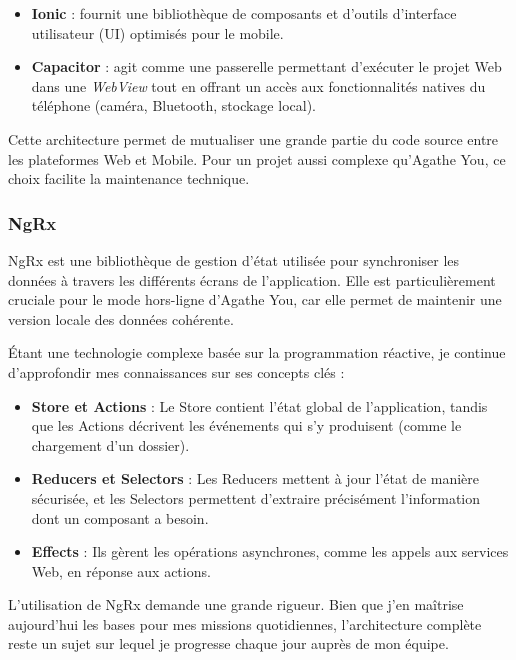 \documentclass{article}
\begin{document}
\begin{itemize}
    \item \textbf{Ionic} : fournit une bibliothèque de composants et d'outils d'interface utilisateur (UI) optimisés pour le mobile.
    \item \textbf{Capacitor} : agit comme une passerelle permettant d'exécuter le projet Web dans une \textit{WebView} tout en offrant un accès aux fonctionnalités natives du téléphone (caméra, Bluetooth, stockage local).
\end{itemize}

Cette architecture permet de mutualiser une grande partie du code source entre les plateformes Web et Mobile. Pour un projet aussi complexe qu'Agathe You, ce choix facilite la maintenance technique.

\subsubsection{NgRx}

NgRx est une bibliothèque de gestion d'état utilisée pour synchroniser les données à travers les différents écrans de l'application. Elle est particulièrement cruciale pour le mode hors-ligne d'Agathe You, car elle permet de maintenir une version locale des données cohérente.

Étant une technologie complexe basée sur la programmation réactive, je continue d'approfondir mes connaissances sur ses concepts clés :

\begin{itemize}
    \item \textbf{Store et Actions} : Le Store contient l'état global de l'application, tandis que les Actions décrivent les événements qui s'y produisent (comme le chargement d'un dossier).
    
    \item \textbf{Reducers et Selectors} : Les Reducers mettent à jour l'état de manière sécurisée, et les Selectors permettent d'extraire précisément l'information dont un composant a besoin.
    
    \item \textbf{Effects} : Ils gèrent les opérations asynchrones, comme les appels aux services Web, en réponse aux actions.
\end{itemize}

L'utilisation de NgRx demande une grande rigueur. Bien que j'en maîtrise aujourd'hui les bases pour mes missions quotidiennes, l'architecture complète reste un sujet sur lequel je progresse chaque jour auprès de mon équipe.
\end{document}
